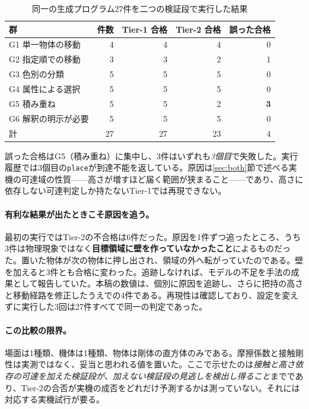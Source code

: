 \documentclass[10pt,letterpaper]{article}
\begin{document}
\begin{table}[h]
\centering\small
\caption{同一の生成プログラム27件を二つの検証段で実行した結果}
\label{tab:tier}
\begin{tabular}{lrrrr}
\toprule
群 & 件数 & Tier-1 合格 & Tier-2 合格 & 誤った合格 \\
\midrule
G1 単一物体の移動   & 4 & 4 & 4 & 0 \\
G2 指定順での移動   & 3 & 3 & 2 & 1 \\
G3 色別の分類       & 5 & 5 & 5 & 0 \\
G4 属性による選択   & 5 & 5 & 5 & 0 \\
G5 積み重ね         & 5 & 5 & 2 & \textbf{3} \\
G6 解釈の明示が必要 & 5 & 5 & 5 & 0 \\
\midrule
計 & 27 & 27 & 23 & 4 \\
\bottomrule
\end{tabular}
\end{table}

誤った合格はG5（積み重ね）に集中し、3件はいずれも\emph{3個目}で失敗した。実行履歴では3個目の\texttt{place}が到達不能を返している。原因は\ref{sec:both}節で述べる実機の可達域の性質——高さが増すほど届く範囲が狭まること——であり、高さに依存しない可達判定しか持たないTier-1では再現できない。

\paragraph{有利な結果が出たときこそ原因を追う。}最初の実行ではTier-2の不合格は6件だった。原因を1件ずつ追ったところ、うち3件は物理現象ではなく\textbf{目標領域に壁を作っていなかったこと}によるものだった。置いた物体が次の物体に押し出され、領域の外へ転がっていたのである。壁を加えると3件とも合格に変わった。追跡しなければ、モデルの不足を手法の成果として報告していた。本稿の数値は、個別に原因を追跡し、さらに把持の高さと移動経路を修正したうえでの4件である。再現性は確認しており、設定を変えずに実行した3回は27件すべてで同一の判定であった。

\paragraph{この比較の限界。}場面は1種類、機体は1種類、物体は剛体の直方体のみである。摩擦係数と接触剛性は実測ではなく、妥当と思われる値を置いた。ここで示せたのは\emph{接触と高さ依存の可達を加えた検証段が、加えない検証段の見逃しを検出し得ること}までであり、Tier-2の合否が実機の成否をどれだけ予測するかは測っていない。それには対応する実機試行が要る。
\end{document}
